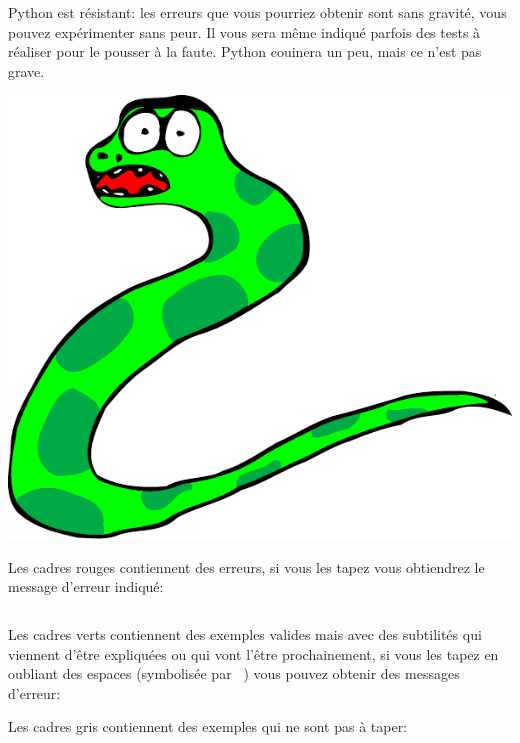 Python est résistant: les erreurs que vous pourriez obtenir sont sans gravité, vous pouvez expérimenter sans peur.
Il vous sera même indiqué parfois des tests à réaliser pour le pousser à la faute. Python couinera un peu, mais ce n'est pas grave.


\begin{center}
\includegraphics[scale=0.5]{images/serpent}
\end{center}

Les cadres rouges contiennent des erreurs, si vous les tapez vous obtiendrez le message d'erreur indiqué:

\begin{Verbatim}[frame=single,rulecolor=\color{red}, label=erreur]

\end{Verbatim}

Les cadres verts contiennent des exemples valides mais avec des subtilités qui viennent d'être expliquées ou qui vont l'être prochainement, si vous les tapez en oubliant des espaces (symbolisée par \verb*+ +) vous pouvez obtenir des messages d'erreur:

\begin{Verbatim*}[frame=single,rulecolor=\color{green}, label=à taper avec attention]
 
\end{Verbatim*}
Les cadres gris contiennent des exemples qui ne sont pas à taper:

\begin{Verbatim}[frame=single,rulecolor=\color{gray}, label=ne pas saisir]
 
\end{Verbatim}



